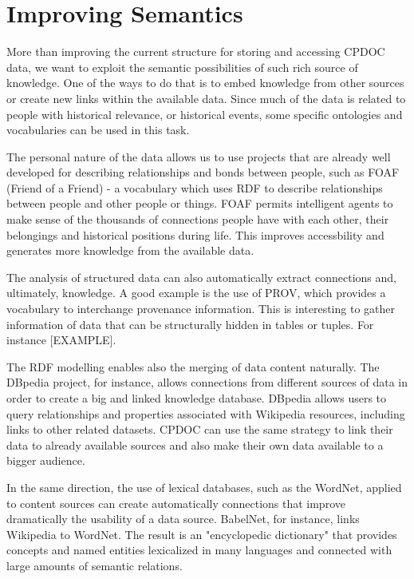 
\section{Improving Semantics}

More than improving the current structure for storing and accessing
CPDOC data, we want to exploit the semantic possibilities of such rich
source of knowledge. One of the ways to do that is to embed knowledge
from other sources or create new links within the available
data. Since much of the data is related to people with historical
relevance, or historical events, some specific ontologies and
vocabularies can be used in this task.

The personal nature of the data allows us to use projects that are
already well developed for describing relationships and bonds between
people, such as FOAF (Friend of a Friend) - a vocabulary which uses
RDF to describe relationships between people and other people or
things. FOAF permits intelligent agents to make sense of the thousands
of connections people have with each other, their belongings and
historical positions during life. This improves accessbility and
generates more knowledge from the available data.

The analysis of structured data can also automatically extract
connections and, ultimately, knowledge. A good example is the use of
PROV, which provides a vocabulary to interchange provenance
information. This is interesting to gather information of data that
can be structurally hidden in tables or tuples. For instance
[EXAMPLE].

The RDF modelling enables also the merging of data content
naturally. The DBpedia project, for instance, allows connections from
different sources of data in order to create a big and linked
knowledge database. DBpedia allows users to query relationships and
properties associated with Wikipedia resources, including links to
other related datasets. CPDOC can use the same strategy to link their
data to already available sources and also make their own data
available to a bigger audience.

In the same direction, the use of lexical databases, such as the
WordNet, applied to content sources can create automatically
connections that improve dramatically the usability of a data
source. BabelNet, for instance, links Wikipedia to WordNet. The result
is an "encyclopedic dictionary" that provides concepts and named
entities lexicalized in many languages and connected with large
amounts of semantic relations.


